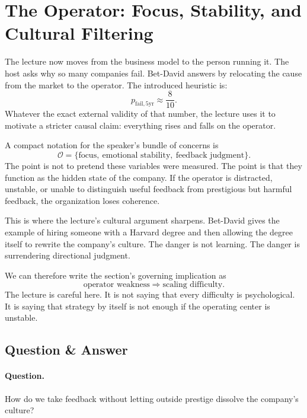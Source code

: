 \section{The Operator: Focus, Stability, and Cultural Filtering}

The lecture now moves from the business model to the person running it. The host asks why so many companies fail. Bet-David answers by relocating the cause from the market to the operator. The introduced heuristic is:
\begin{equation}
p_{\text{fail},5\text{yr}} \approx \frac{8}{10}.
\end{equation}
Whatever the exact external validity of that number, the lecture uses it to motivate a stricter causal claim: everything rises and falls on the operator.

A compact notation for the speaker's bundle of concerns is
\begin{equation}
\mathcal{O}=\{\text{focus},\ \text{emotional stability},\ \text{feedback judgment}\}.
\end{equation}
The point is not to pretend these variables were measured. The point is that they function as the hidden state of the company. If the operator is distracted, unstable, or unable to distinguish useful feedback from prestigious but harmful feedback, the organization loses coherence.

This is where the lecture's cultural argument sharpens. Bet-David gives the example of hiring someone with a Harvard degree and then allowing the degree itself to rewrite the company's culture. The danger is not learning. The danger is surrendering directional judgment.

We can therefore write the section's governing implication as
\begin{equation}
\text{operator weakness} \Rightarrow \text{scaling difficulty}.
\end{equation}
The lecture is careful here. It is not saying that every difficulty is psychological. It is saying that strategy by itself is not enough if the operating center is unstable.

\subsection{Question \& Answer}

\paragraph{Question.} How do we take feedback without letting outside prestige dissolve the company's culture?


